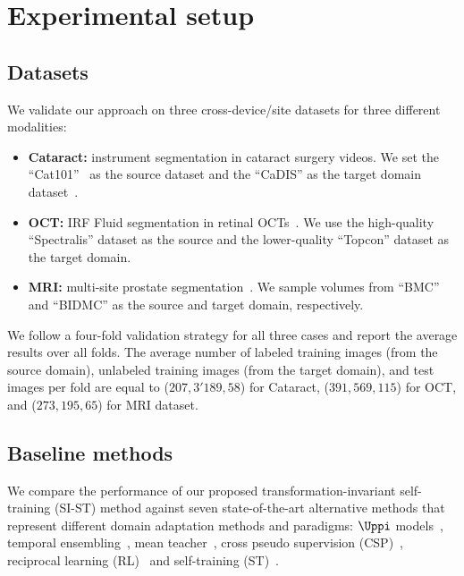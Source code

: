 \section{Experimental setup}
\label{sec:tist_experimental_settings}

\subsection{Datasets}
We validate our approach on three cross-device/site datasets for three different modalities: 

\begin{itemize}
    \item \textbf{Cataract:} instrument segmentation in cataract surgery videos. We set the ``Cat101''~ as the source dataset and the ``CaDIS'' as the target domain dataset~. 
    \item \textbf{OCT:} IRF Fluid segmentation in retinal OCTs~. We use the high-quality ``Spectralis'' dataset as the source and the lower-quality ``Topcon'' dataset as the target domain.
    \item \textbf{MRI:} multi-site prostate segmentation~. We sample volumes from ``BMC'' and ``BIDMC'' as the source and target domain, respectively.
\end{itemize} 

We follow a four-fold validation strategy for all three cases and report the average results over all folds. The average number of labeled training images (from the source domain), unlabeled training images (from the target domain), and test images per fold are equal to ($207, 3'189,58$) for Cataract, ($391,569,115$) for OCT, and ($273,195,65$) for MRI dataset.

\subsection{Baseline methods}
We compare the performance of our proposed transformation-invariant self-training (SI-ST) method against seven state-of-the-art alternative methods that represent different domain adaptation methods and paradigms: $\Uppi$ models~, temporal ensembling~, mean teacher~, cross pseudo supervision (CSP)~, reciprocal learning (RL)~ and self-training (ST)~.

